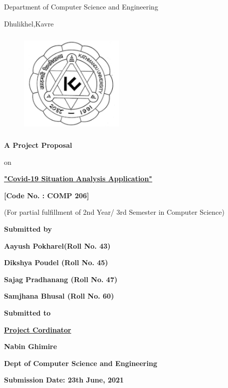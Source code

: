 \documentclass{article}
\begin{document}
\thispagestyle{empty}

\section*{}
{\LARGE{}}

\centerline{Department of Computer Science and Engineering}
\centerline{Dhulikhel,Kavre}
\begin{figure}[h]
    \centerline{\includegraphics[width=50.546mm,height=50.546mm]{KU_Logo.png}}
\end{figure}

\centerline{\textbf{A Project Proposal}}
\centerline{on}
\centerline{\underline{\textbf{"Covid-19 Situation Analysis Application"}}}

\vspace*{12mm}

\centerline{\textbf{[Code No. : COMP 206]}}
\centerline{(For partial fulfillment of 2nd Year/ 3rd Semester in Computer Science)}

\vspace*{10mm}

\centerline{\textbf{Submitted by}}
\centerline{\textbf{Aayush Pokharel(Roll No. 43)}}
\centerline{\textbf{Dikshya Poudel (Roll No. 45)}}
\centerline{\textbf{Sajag Pradhanang (Roll No. 47)}}
\centerline{\textbf{Samjhana Bhusal (Roll No. 60)}}

\vspace*{16mm}


\centerline{\textbf{Submitted to}}
\centerline{\underline{\textbf{Project Cordinator}}}
\centerline{\textbf{Nabin Ghimire}}
\centerline{\textbf{Dept of Computer Science and Engineering}}

\vspace*{10mm}

\centerline{\textbf{Submission Date: 23th June, 2021}}



\clearpage
\thispagestyle{empty}
\end{document}
